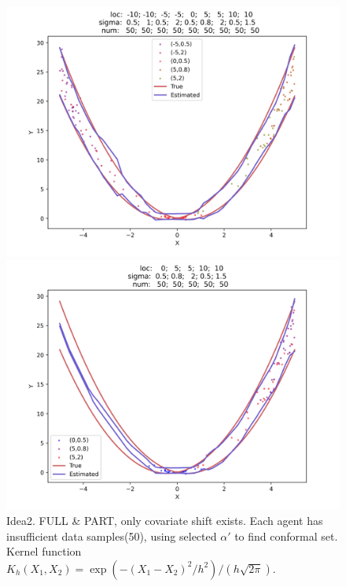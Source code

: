 \documentclass[12pt, a4paper, oneside]{article}
\begin{document}
    \begin{figure}[htbp]
        \centering
        \begin{minipage}{0.495\linewidth}
            \centering
            \includegraphics[width=0.98\linewidth]{fig/Ex2_1/SPARSEFULL.png}
        \end{minipage}
        \begin{minipage}{0.495\linewidth}
            \centering
            \includegraphics[width=0.98\linewidth]{fig/Ex2_1/SPARSEPART.png}
        \end{minipage}
        \caption{Idea2. FULL \& PART, only covariate shift exists. Each agent has insufficient data samples(50), using selected $\alpha'$ to find conformal set. Kernel function $K_h(X_1,X_2)=\exp\left( -{(X_1-X_2)^2}/{h^2} \right)/(h\sqrt{2\pi})$.}
        \label{Fig10}
    \end{figure}

\newpage



\end{document}
